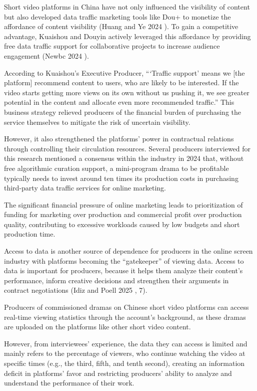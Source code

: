 \documentclass[10pt,a4paper]{article}
\begin{document}
Short video platforms in China have not only influenced the visibility of content but also developed data traffic marketing tools like Dou+ to monetize the affordance of content visibility (Huang and Ye 2024 ). To gain a competitive advantage, Kuaishou and Douyin actively leveraged this affordance by providing free data traffic support for collaborative projects to increase audience engagement (Newbc 2024 ).\par
According to Kuaishou’s Executive Producer, “‘Traffic support’ means we [the platform] recommend content to users, who are likely to be interested. If the video starts getting more views on its own without us pushing it, we see greater potential in the content and allocate even more recommended traffic.” This business strategy relieved producers of the financial burden of purchasing the service themselves to mitigate the risk of uncertain visibility.\par
However, it also strengthened the platforms’ power in contractual relations through controlling their circulation resources. Several producers interviewed for this research mentioned a consensus within the industry in 2024 that, without free algorithmic curation support, a mini-program drama to be profitable typically needs to invest around ten times its production costs in purchasing third-party data traffic services for online marketing.\par
The significant financial pressure of online marketing leads to prioritization of funding for marketing over production and commercial profit over production quality, contributing to excessive workloads caused by low budgets and short production time.\par
Access to data is another source of dependence for producers in the online screen industry with platforms becoming the “gatekeeper” of viewing data. Access to data is important for producers, because it helps them analyze their content’s performance, inform creative decisions and strengthen their arguments in contract negotiations (Idiz and Poell 2025 , 7).\par
Producers of commissioned dramas on Chinese short video platforms can access real-time viewing statistics through the account’s background, as these dramas are uploaded on the platforms like other short video content.\par
However, from interviewees’ experience, the data they can access is limited and mainly refers to the percentage of viewers, who continue watching the video at specific times (e.g., the third, fifth, and tenth second), creating an information deficit in platforms’ favor and restricting producers’ ability to analyze and understand the performance of their work.\par
\end{document}
